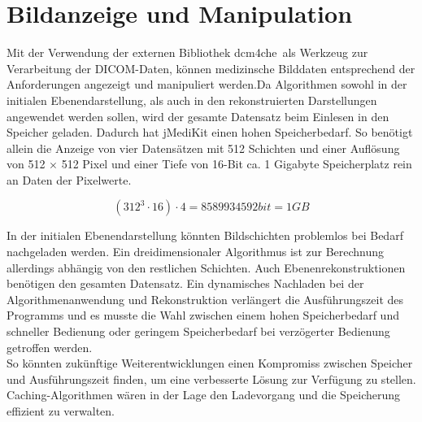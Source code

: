 \section*{Bildanzeige und Manipulation}
Mit der Verwendung der externen Bibliothek \glqq dcm4che\grqq\ als Werkzeug zur Verarbeitung der DICOM-Daten, können medizinsche Bilddaten entsprechend der Anforderungen angezeigt und manipuliert werden.Da Algorithmen sowohl in der initialen Ebenendarstellung, als auch in den rekonstruierten Darstellungen angewendet werden sollen, wird der gesamte Datensatz beim Einlesen in den Speicher geladen. Dadurch hat jMediKit einen hohen Speicherbedarf. So benötigt allein die Anzeige von vier Datensätzen mit 512 Schichten und einer Auflösung von 512 $\times$ 512 Pixel und einer Tiefe von 16-Bit ca. 1 Gigabyte Speicherplatz rein an Daten der Pixelwerte.

\begin{equation}
(312^3 \cdot 16)\cdot 4  = 8589934592 bit = 1 GB
\end{equation}

In der initialen Ebenendarstellung könnten Bildschichten problemlos bei Bedarf nachgeladen werden. Ein dreidimensionaler Algorithmus ist zur Berechnung allerdings abhängig von den restlichen Schichten. Auch Ebenenrekonstruktionen benötigen den gesamten Datensatz. Ein dynamisches Nachladen bei der Algorithmenanwendung und Rekonstruktion verlängert die Ausführungszeit des Programms und es musste die Wahl zwischen einem hohen Speicherbedarf und schneller Bedienung oder geringem Speicherbedarf bei verzögerter Bedienung getroffen werden.\\
So könnten zukünftige Weiterentwicklungen einen Kompromiss zwischen Speicher und Ausführungszeit finden, um eine verbesserte Lösung zur Verfügung zu stellen. Caching-Algorithmen wären in der Lage den Ladevorgang und die Speicherung effizient zu verwalten.

